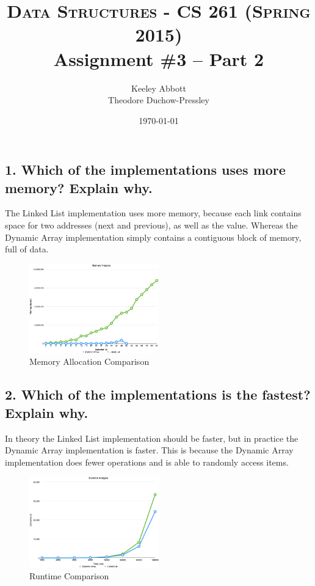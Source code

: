 \documentclass[letter,11pt]{scrartcl}
\title{
  \normalfont \normalsize
  \textsc{Data Structures - CS 261 (Spring 2015)} \\
  \huge Assignment \#3 -- Part 2
}
\author{Keeley Abbott
\\ Theodore Duchow-Pressley}
\date{\normalsize\today}
\begin{document}
\maketitle


\subsection*{1. Which of the implementations uses more memory? Explain why.}

The Linked List implementation uses more memory, because each link contains
space for two addresses (next and previous), as well as the value. Whereas the
Dynamic Array implementation simply contains a contiguous block of memory, full of data.

\begin{figure}[H]
  \centering
  \includegraphics[width=0.5\textwidth]{memory}
  \caption{Memory Allocation Comparison}
\end{figure}


\subsection*{2. Which of the implementations is the fastest? Explain why.}

In theory the Linked List implementation should be faster, but in practice the
Dynamic Array implementation is faster. This is because the Dynamic Array
implementation does fewer operations and is able to randomly access items.

\begin{figure}[H]
  \centering
  \includegraphics[width=0.5\textwidth]{runtime}
  \caption{Runtime Comparison}
\end{figure}
\end{document}
